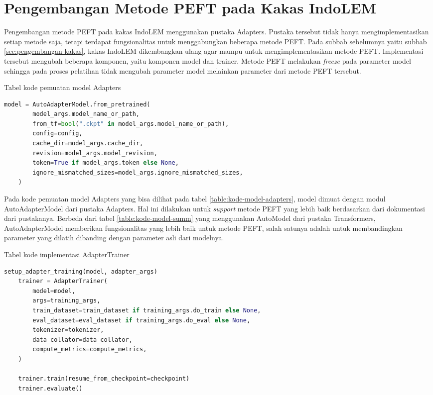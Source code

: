 \section{Pengembangan Metode PEFT pada Kakas IndoLEM}

Pengembangan metode PEFT pada kakas IndoLEM menggunakan pustaka Adapters. Pustaka tersebut tidak hanya mengimplementasikan setiap metode saja, tetapi terdapat fungsionalitas untuk menggabungkan beberapa metode PEFT. Pada subbab sebelumnya yaitu subbab \ref{sec:pengembangan-kakas}, kakas IndoLEM dikembangkan ulang agar mampu untuk mengimplementasikan metode PEFT. Implementasi tersebut  mengubah beberapa komponen, yaitu komponen model dan trainer. Metode PEFT  melakukan \textit{freeze} pada parameter model sehingga pada proses pelatihan tidak  mengubah parameter model melainkan parameter dari metode PEFT tersebut.

\begin{table}[h]
    \caption{Tabel kode pemuatan model Adapters}
    \label{table:kode-model-adapters}
    \begin{lstlisting}[language=python]
    model = AutoAdapterModel.from_pretrained(
        model_args.model_name_or_path,
        from_tf=bool(".ckpt" in model_args.model_name_or_path),
        config=config,
        cache_dir=model_args.cache_dir,
        revision=model_args.model_revision,
        token=True if model_args.token else None,
        ignore_mismatched_sizes=model_args.ignore_mismatched_sizes,
    )
    \end{lstlisting}
\end{table}

Pada kode pemuatan model Adapters yang bisa dilihat pada tabel \ref{table:kode-model-adapters}, model dimuat dengan modul AutoAdapterModel dari pustaka Adapters. Hal ini dilakukan untuk \textit{support} metode PEFT yang lebih baik berdasarkan dari dokumentasi dari pustakanya. Berbeda dari tabel \ref{table:kode-model-summ} yang menggunakan AutoModel dari pustaka Transformers, AutoAdapterModel memberikan fungsionalitas yang lebih baik untuk metode PEFT, salah satunya adalah untuk membandingkan parameter yang  dilatih dibanding dengan parameter asli dari modelnya.

\begin{table}[h]
    \caption{Tabel kode implementasi AdapterTrainer}
    \label{table:kode-adaptertrainer}
    \begin{lstlisting}[language=python]
    setup_adapter_training(model, adapter_args)
    trainer = AdapterTrainer(
        model=model,
        args=training_args,
        train_dataset=train_dataset if training_args.do_train else None,
        eval_dataset=eval_dataset if training_args.do_eval else None,
        tokenizer=tokenizer,
        data_collator=data_collator,
        compute_metrics=compute_metrics,
    )

    trainer.train(resume_from_checkpoint=checkpoint)
    trainer.evaluate()
    \end{lstlisting}
\end{table}

